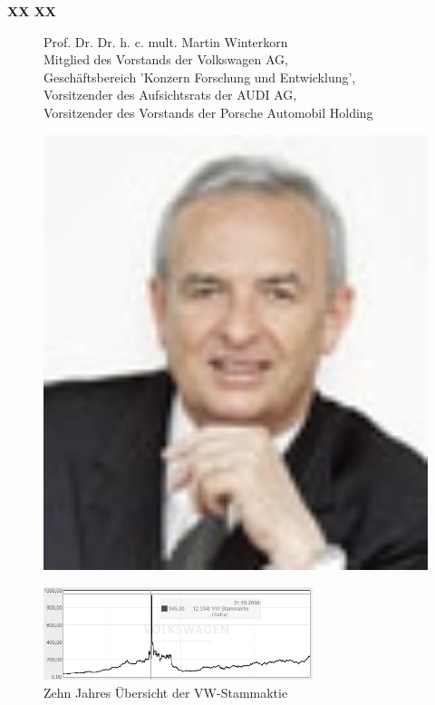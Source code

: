\documentclass[12pt]{article}
\begin{document}
\textbf{XX XX}
\begin{figure}[here!]
	\centering
	\begin{minipage}[h]{0.65\textwidth}
		Prof. Dr. Dr. h. c. mult. Martin Winterkorn\\
		Mitglied des Vorstands der Volkswagen AG,\\
		Geschäftsbereich 'Konzern Forschung und Entwicklung',\\
		Vorsitzender des Aufsichtsrats der AUDI AG,\\
		Vorsitzender des Vorstands der Porsche Automobil Holding 
	\end{minipage}
		\begin{minipage}[h]{0.10\textwidth}
		\hspace{1cm} 
	\end{minipage}
	\begin{minipage}[h]{0.20\textwidth}
		\centering
		\includegraphics[width=1.0\textwidth]{images/MartinWinterkorn.jpg}
		\label{fig:vorstandvw0}
	\end{minipage}
\end{figure}




\begin{figure}[here!]
	\centering
	\includegraphics[width=0.7\textwidth]{images/finanzen2015S}
	\caption{Zehn Jahres Übersicht der VW-Stammaktie \cite{aktienfotos}}
	\label{fig:vwaktie2}
\end{figure}\FloatBarrier
\end{document}

